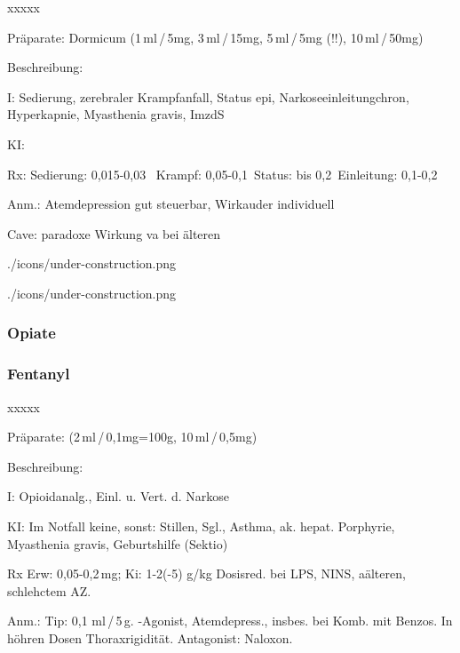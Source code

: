 {
\begin{labeling}[~]{xxxxx}
  \item[Präparate:] Dormicum (1\,ml\,/\,5mg, 3\,ml\,/\,15mg, 5\,ml\,/\,5mg (!!), 10\,ml\,/\,50mg)
  \item[Beschreibung:] 
  \item[I:] Sedierung, zerebraler Krampfanfall,
Status epi, Narkoseeinleitungchron, Hyperkapnie, Myasthenia gravis,
ImzdS
  \item[KI:] 
  \item[Rx:] Sedierung: 0,015-0,03 \,\newline
Krampf: 0,05-0,1\,\newline
Status: bis 0,2\,\newline
Einleitung: 0,1-0,2\,
\item[Anm.:] Atemdepression gut steuerbar, Wirkauder individuell
\item[Cave:]  paradoxe Wirkung va bei älteren
\end{labeling}
}
{}
{./icons/under-construction.png}
{}
{}



{

}
{}
{./icons/under-construction.png}
{}
{}

\subsubsection{Opiate}


\subsubsection{Fentanyl}




\begin{labeling}[~]{xxxxx}
  \item[Präparate:] (2\,ml\,/\,0,1mg=100{\textmu}g, 10\,ml\,/\,0,5mg)
  \item[Beschreibung:]
  \item[I:] Opioidanalg., Einl. u. Vert. d. Narkose
  \item[KI:] Im Notfall keine, sonst: Stillen, Sgl., Asthma, ak. hepat.
  Porphyrie, Myasthenia gravis, Geburtshilfe (Sektio)
  \item[Rx] Erw: 0,05-0,2\,mg; Ki: 1-2(-5) {\textmu}g/kg \newline
  Dosisred. bei LPS, NINS, aälteren, schlehctem AZ.
  \item[Anm.:] Tip: 0,1\,\,ml\,/\,5\,{\textmu}g. {\textmu}-Agonist, Atemdepress.,
  insbes. bei Komb. mit Benzos. In höhren Dosen Thoraxrigidität. Antagonist: Naloxon.
\end{labeling}





